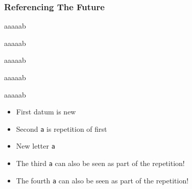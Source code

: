 \begin{frame}
  \frametitle{Referencing The Future}
  \begin{overprint}
    \begin{center} \ttfamily
      \alert{a}aaaab
    \end{center}

    \begin{center} \ttfamily
      a\alert{a}{\color{green}a}aab
    \end{center}

    \begin{center} \ttfamily
      a\alert{aa}{\color{green}a}ab
    \end{center}

    \begin{center} \ttfamily
      a\alert{aaa}{\color{green}a}b
    \end{center}

    \begin{center} \ttfamily
      a\alert{aaaa}{\color{green}b}
    \end{center}
  \end{overprint}
  \begin{overprint}
    \begin{itemize}
      \item First datum is new
    \end{itemize}

    \begin{itemize}
      \item Second \texttt{a} is repetition of first
      \item New letter \texttt{a}
    \end{itemize}

    \begin{itemize}
      \item The third \texttt{a} can also be seen as part of the repetition!
    \end{itemize}

    \begin{itemize}
      \item The fourth \texttt{a} can also be seen as part of the repetition!
    \end{itemize}


\end{overprint}
\end{frame}
